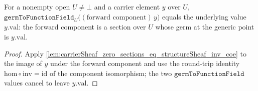 \begin{lemma}

  \label{lem:carrierSheaf_zero_sections_eq_structureSheaf_hom_coe}
  For a nonempty open \(U \neq \bot\) and a carrier element \(y\) over \(U\),
  \(\texttt{germToFunctionField}_U\bigl((\text{forward component})\,y\bigr)\) equals the
  underlying value \(y.\mathrm{val}\): the forward component is a section over \(U\)
  whose germ at the generic point is \(y.\mathrm{val}\).
\end{lemma}
\begin{proof}
  \leanok
  Apply \cref{lem:carrierSheaf_zero_sections_eq_structureSheaf_inv_coe} to the image
  of \(y\) under the forward component and use the round-trip identity
  \(\mathrm{hom}\circ\mathrm{inv}=\mathrm{id}\) of the component isomorphism; the two
  \(\texttt{germToFunctionField}\) values cancel to leave \(y.\mathrm{val}\).
\end{proof}


